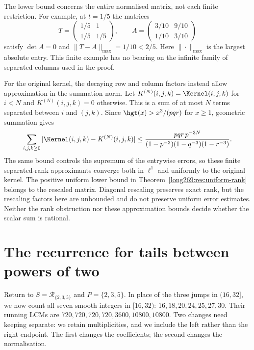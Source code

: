 The lower bound concerns the entire normalised matrix, not each finite
restriction.  For example, at $t=1/5$ the matrices
\[
 T=\begin{pmatrix}1/5&1\\1/5&1/5\end{pmatrix},\qquad
 A=\begin{pmatrix}3/10&9/10\\1/10&3/10\end{pmatrix}
\]
satisfy $\det A=0$ and $\|T-A\|_{\max}=1/10<2/5$.
Here $\|\cdot\|_{\max}$ is the largest absolute entry.  This finite
example has no bearing on the infinite family of separated columns used
in the proof.

For the original kernel, the decaying row and column factors instead
allow approximation in the summation norm.  Let $K^{(N)}(i,j,k)=\Kernel(i,j,k)$ for $i<N$ and
$K^{(N)}(i,j,k)=0$ otherwise.  This is a sum of at most $N$ terms separated
between $i$ and $(j,k)$.  Since
$\hgt(x)>x^3/(pqr)$ for $x\ge1$, geometric summation gives
\begin{equation}\label{long269:eq:l1-finite-rank-approximation}
 \sum_{i,j,k\ge0}|\Kernel(i,j,k)-K^{(N)}(i,j,k)|
 \le
 \frac{pqr\,p^{-3N}}
 {(1-p^{-3})(1-q^{-3})(1-r^{-3})}.
\end{equation}
The same bound controls the supremum of the entrywise errors, so these
finite separated-rank approximants converge both in $\ell^1$ and uniformly
to the original kernel.  The positive uniform lower bound in
Theorem~\ref{long269:res:uniform-rank} belongs to the rescaled matrix.
Diagonal rescaling preserves exact rank, but the rescaling factors here
are unbounded and do not preserve uniform error estimates.  Neither the
rank obstruction nor these approximation bounds decide whether the scalar
sum is rational.

\section{The recurrence for tails between powers of two}\label{long269:sec:blocks}

Return to $S=\mathcal R_{\{2,3,5\}}$ and $P=\{2,3,5\}$. In place of
the three jumps in $(16,32]$, we now count all seven smooth integers in
$[16,32)$: $16,18,20,24,25,27,30$. Their running LCMs are
$720,720,720,720,3600,10800,10800$. Two changes need keeping separate:
we retain multiplicities, and we include the left rather than the right
endpoint. The first changes the coefficients; the second changes the
normalisation.

